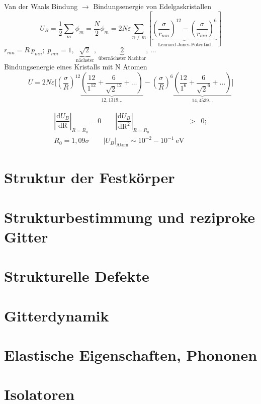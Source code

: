 \nr
Van der Waals Bindung $\to$ Bindungsenergie von Edelgaskristallen
\[
U_B=\dfrac{1}{2}\sum_{m}\phi_{m}=\dfrac{N}{2}\phi_{m}=2N\varepsilon \sum_{n\neq m}\left[ \underbrace{ \left(\dfrac{\sigma}{r_{m n}}\right)^{12} - \left(\dfrac{\sigma}{r_{m n}}\right)^{6} }_{\text{Lennard-Jones-Potential} } \right]
\] 
$r_{m n }=R\ p_{m n};\; p_{m n}=1,\, \underbrace{\sqrt{2}}_{\text{n\"achster}},\, \underbrace{2}_{\text{\"ubern\"achster Nachbar}},\, \ldots$
\\
Bindungsenergie eines Kristalls mit N Atomen
\[
U = 2N\varepsilon \Bigg[ \left( \dfrac{\sigma}{R} \right)^{12} \underbrace{ \left( \dfrac{12}{1^{12}} + \dfrac{6}{\sqrt{2}^{12}} + \ldots \right) }_{12,1319\ldots} - \left( \dfrac{\sigma}{R} \right)^{6} \underbrace{ \left( \dfrac{12}{1^{6}} + \dfrac{6}{\sqrt{2}^{6}} + \ldots \right) }_{14,4539\ldots} \Bigg]
\]

\begin{eqnarray*}
\left|\dfrac{\text{d}U_{B}}{\text{dR}} \right|_{R=R_{0}}  =  0 \qquad
 \left|\dfrac{\text{d}U_{B}}{\text{dR}^{2}} \right|_{R=R_{0}} & > & 0; \\
R_{0}  =  1,09 \sigma \qquad
\left| U_{B} \right|_{\text{Atom}}   \sim 10^{-2} - 10^{-1}~\text{eV}
\end{eqnarray*}


\section{Struktur der Festkörper}
\section{Strukturbestimmung und reziproke Gitter}
\section{Strukturelle Defekte}
\section{Gitterdynamik}
\section{Elastische Eigenschaften, Phononen}
\section{Isolatoren}
